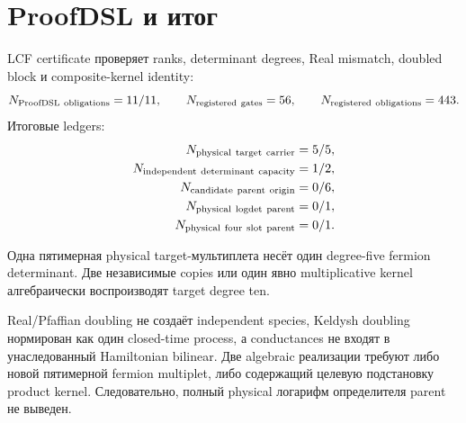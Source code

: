 \section{ProofDSL и итог}

LCF certificate проверяет ranks, determinant degrees, Real mismatch,
doubled block и composite-kernel identity:
\begin{equation}
 N_{\rm ProofDSL\ obligations}=11/11,
 \qquad N_{\rm registered\ gates}=56,
 \qquad N_{\rm registered\ obligations}=443.
 \label{eq:v9-kms-physical-loop-proofdsl}
\end{equation}
Итоговые ledgers:
\begin{equation}
 \begin{aligned}
 N_{\rm physical\ target\ carrier}&=5/5,\\
 N_{\rm independent\ determinant\ capacity}&=1/2,\\
 N_{\rm candidate\ parent\ origin}&=0/6,\\
 N_{\rm physical\ logdet\ parent}&=0/1,\\
 N_{\rm physical\ four\ slot\ parent}&=0/1.
 \end{aligned}
 \label{eq:v9-kms-physical-loop-ledger}
\end{equation}

\begin{theorem}
Одна пятимерная physical target-мультиплета несёт один degree-five
fermion determinant. Две независимые copies или один явно multiplicative
kernel алгебраически воспроизводят target degree ten.
\end{theorem}

\begin{nogocriterion}
Real/Pfaffian doubling не создаёт independent species, Keldysh doubling
нормирован как один closed-time process, а conductances не входят в
унаследованный Hamiltonian bilinear. Две algebraic реализации требуют либо
новой пятимерной fermion multiplet, либо содержащий целевую подстановку product kernel.
Следовательно, полный physical логарифм определителя parent не выведен.
\end{nogocriterion}

